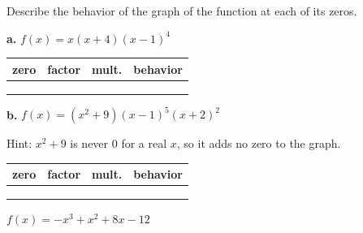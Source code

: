 Describe the behavior of the graph of the function at each of its zeros.

\renewcommand{\arraystretch}{1.6}
\begin{minipage}[t]{0.48\textwidth}
\vspace{0pt}
\textbf{a.} $f(x)=x(x+4)(x-1)^4$

\vspace{4pt}
\begin{tabular}{|p{1.1cm}|p{1.5cm}|p{1.1cm}|p{3cm}|}
\hline
\textbf{zero} & \textbf{factor} & \textbf{mult.} & \textbf{behavior} \\ \hline
 & & & \\ \hline
 & & & \\ \hline
 & & & \\ \hline
\end{tabular}
\end{minipage}\hfill
\begin{minipage}[t]{0.48\textwidth}
\vspace{0pt}
\textbf{b.} $f(x)=(x^2+9)(x-1)^5(x+2)^2$

Hint: $x^2+9$ is never 0 for a real $x$, so it adds no zero to the graph.

\vspace{4pt}
\begin{tabular}{|p{1.1cm}|p{1.5cm}|p{1.1cm}|p{3cm}|}
\hline
\textbf{zero} & \textbf{factor} & \textbf{mult.} & \textbf{behavior} \\ \hline
 & & & \\ \hline
 & & & \\ \hline
 & & & \\ \hline
\end{tabular}
\end{minipage}
\renewcommand{\arraystretch}{1.35}

\newpage
$f(x)=-x^3+x^2+8x-12$

